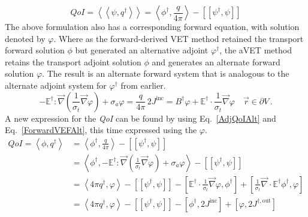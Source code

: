 \documentclass[12pt]{report}
\newcommand{\vr}{\vec{r}}
\newcommand{\bra}{\left\langle}
\newcommand{\ket}{\right\rangle}
\newcommand{\braSN}{\left\langle \! \left\langle}
\newcommand{\ketSN}{\right\rangle \! \right\rangle}
\newcommand{\sbraSN}{\left[ \! \left[}
\newcommand{\sketSN}{\right] \! \right]}
\newcommand{\sbra}{\left[}
\newcommand{\sket}{\right]}
\renewcommand{\div}{\vec{\nabla} \cdot}
\newcommand{\grad}{\vec{\nabla}}
\newcommand{\bound}{\partial V}
\newcommand{\Edd}{\mathbb{E}}
\newcommand{\BEdd}{B}
\newcommand{\sigt}{\sigma_t}
\newcommand{\siga}{\sigma_a}
\newcommand{\angSource}{\frac{q}{4 \pi}}
\newcommand{\scalResp}{q^\dag}
\newcommand{\qoi}{{\it QoI}\xspace}
\begin{document}
\begin{equation}
\label{AdjQoIAlt}
QoI = \braSN \psi , \scalResp\ketSN = \bra \phi^\dag , \angSource \ket - \sbraSN \psi^\dag,  \psi \sketSN 
\end{equation}
The above formulation also has a corresponding forward equation, with solution denoted by $\varphi$. Where as the forward-derived VET method retained the transport forward solution $\phi$ but generated an alternative adjoint $\varphi^\dag$, the aVET method retains the transport adjoint solution $\phi$ and generates an alternate forward solution $\varphi$. The result is an alternate forward system that is analogous to the alternate adjoint system for $\varphi^\dag$ from earlier.
\begin{subequations}
\begin{equation}
\label{ForwardVEFAlt}
- \Edd^\dag : \grad \left( \frac{1}{\sigt}\grad \varphi \right) + \siga \varphi  = \angSource  \,
\end{equation}
\begin{equation}
2 J^{\text{inc}}= \BEdd^\dag \varphi + \Edd^\dag \cdot \frac{1}{\sigt} \grad \varphi \quad \vr \in \bound \,.
\end{equation} 
\end{subequations}
A new expression for the \qoi can be found by using Eq.~\eqref{AdjQoIAlt} and Eq.~\eqref{ForwardVEFAlt}, this time expressed using the $\varphi$.
 \begin{equation}
\label{AdjQoIAltExpand}
\begin{split}
QoI = \bra \phi , \scalResp \ket &= \bra \phi^\dag , \angSource \ket - \sbraSN \psi^\dag,  \psi \sketSN \\
&= \bra \phi^\dag , - \Edd^\dag : \grad \left( \frac{1}{\sigt}\grad \varphi \right) + \siga \varphi \ket - \sbraSN \psi^\dag,  \psi \sketSN \\
&= \bra 4\pi \scalResp  ,\varphi \ket - \sbraSN \psi^\dag,  \psi \sketSN  
- \sbra \Edd^\dag \cdot \frac{1}{\sigt}\grad \varphi,  \phi^\dag \sket 
+ \sbra \frac{1}{\sigt} \div \Edd^\dag \phi^\dag,  \varphi \sket \\
&=  \bra 4\pi \scalResp  ,\varphi \ket - \sbraSN \psi^\dag,  \psi \sketSN - \sbra \phi^\dag, 2J^{\text{inc}} \sket + \sbra \varphi , 2 J^{\dag,\text{out}} \sket
\end{split}
\end{equation}

\end{document}
